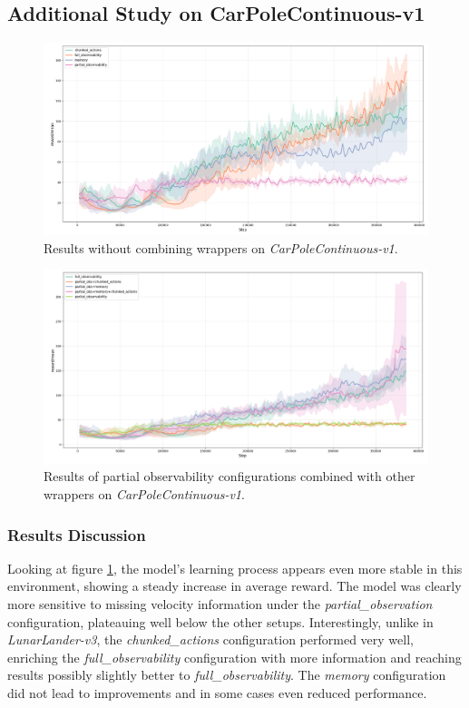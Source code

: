 \documentclass[12pt, a4paper]{article}
\begin{document}
\subsection{Additional Study on CarPoleContinuous-v1}
\begin{figure}[H]
	\centering
	\includegraphics[width=1\linewidth]{results_car_pole_basic}
	\caption{Results without combining wrappers on \textit{CarPoleContinuous-v1}.}
	\label{fig:resultscarpolebasic}
\end{figure}

\begin{figure}[H]
	\centering
	\includegraphics[width=1\linewidth]{results_car_pole_combined}
	\caption{Results of partial observability configurations combined with other wrappers on \textit{CarPoleContinuous-v1}.}
	\label{fig:resultscarpolecombined}
\end{figure}

\subsubsection{Results Discussion}
Looking at figure \ref{fig:resultscarpolebasic}, the model’s learning process appears even more stable in this environment, showing a steady increase in average reward. The model was clearly more sensitive to missing velocity information under the \textit{partial\_observation} configuration, plateauing well below the other setups. Interestingly, unlike in \textit{LunarLander-v3}, the \textit{chunked\_actions} configuration performed very well, enriching the \textit{full\_observability} configuration with more information and reaching results possibly slightly better to \textit{full\_observability}. The \textit{memory} configuration did not lead to improvements and in some cases even reduced performance. \newline
\end{document}
